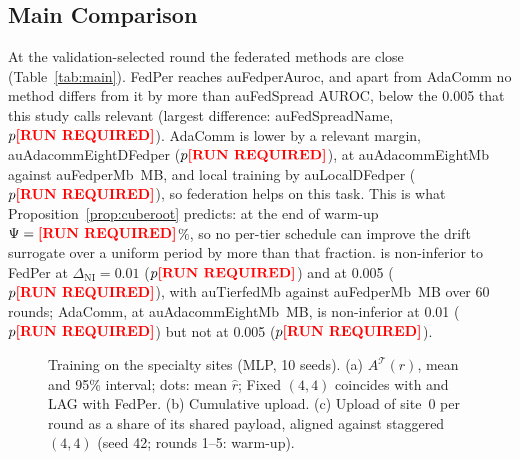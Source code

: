 \subsection{Main Comparison}
\label{sec:results-main}
At the validation-selected round the federated methods are close (Table~\ref{tab:main}). FedPer reaches \num{auFedperAuroc}, and apart from AdaComm no method differs from it by more than \num{auFedSpread} AUROC, below the 0.005 that this study calls relevant (largest difference: \num{auFedSpreadName}, $p\num{auFedMinP}$). AdaComm is lower by a relevant margin, \num{auAdacommEightDFedper} ($p\num{auAdacommEightDFedperP}$), at \num{auAdacommEightMb} against \num{auFedperMb}~MB, and local training by \num{auLocalDFedper} ($p\num{auLocalDFedperP}$), so federation helps on this task.
%
This is what Proposition~\ref{prop:cuberoot} predicts: at the end of warm-up $\Psi=\num{auGateSpecialtyPsi}$\%, so no per-tier schedule can improve the drift surrogate over a uniform period by more than that fraction. \tierfed{} is non-inferior to FedPer at $\Delta_{\mathrm{NI}}=0.01$ ($p\num{auTierfedNiTenP}$) and at 0.005 ($p\num{auTierfedNiFiveP}$), with \num{auTierfedMb} against \num{auFedperMb}~MB over 60 rounds; AdaComm, at \num{auAdacommEightMb}~MB, is non-inferior at 0.01 ($p\num{auAdacommEightNiTenP}$) but not at 0.005 ($p\num{auAdacommEightNiFiveP}$).

\begin{figure}[t]
\centering{}
\caption{Training on the specialty sites (MLP, 10 seeds). (a) $A^{\mathcal T}(r)$, mean and 95\% interval; dots: mean $\hat r$; Fixed $(4,4)$ coincides with \tierfed{} and LAG with FedPer. (b) Cumulative upload. (c) Upload of site~0 per round as a share of its shared payload, aligned against staggered $(4,4)$ (seed 42; rounds 1--5: warm-up).}
\label{fig:dyn}
\end{figure}

